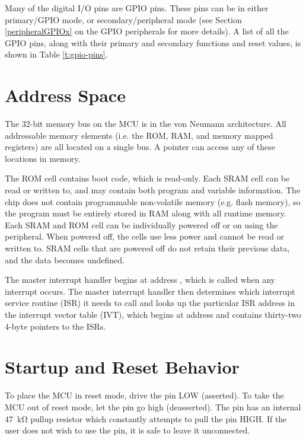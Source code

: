 \documentclass[11pt,pdftex,portrait,letterpaper]{article}
\begin{document}


Many of the digital I/O pins are GPIO pins. These pins can be in either primary/GPIO mode, or secondary/peripheral mode (see Section \ref{peripheralGPIOx} on the GPIO peripherals for more details). A list of all the GPIO pins, along with their primary and secondary functions and reset values, is shown in Table \ref{t:gpio-pins}.



\newpage



\section{Address Space} \label{s:addressSpace}
\resizebox{!}{0.75\height}{}

The 32-bit memory bus on the MCU is in the von Neumann architecture. All addressable memory elements (i.e. the ROM, RAM, and memory mapped registers) are all located on a single bus. A pointer can access any of these locations in memory.

The ROM cell contains boot code, which is read-only. Each SRAM cell can be read or written to, and may contain both program and variable information. The chip does not contain programmable non-volatile memory (e.g. flash memory), so the program must be entirely stored in RAM along with all runtime memory. Each SRAM and ROM cell can be individually powered off or on using the  peripheral. When powered off, the cells use less power and cannot be read or written to. SRAM cells that are powered off do not retain their previous data, and the data becomes undefined.


The master interrupt handler begins at address \texttt{\ProgaddrIrq}, which is called when any interrupt occurs. The master interrupt handler then determines which interrupt service routine (ISR) it needs to call and looks up the particular ISR address in the interrupt vector table (IVT), which begins at address \texttt{\VectorsStartAddress} and contains thirty-two 4-byte pointers to the ISRs.

\newpage



\section{Startup and Reset Behavior} \label{s:startup}
To place the MCU in reset mode, drive the  pin LOW (asserted). To take the MCU out of reset mode, let the  pin go high (deasserted). The  pin has an internal 47~\si{\kilo\ohm} pullup resistor which constantly attempts to pull the  pin HIGH. If the user does not wish to use the  pin, it is safe to leave it unconnected.
\end{document}
